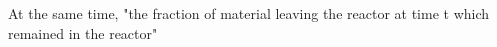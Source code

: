 At the same time, "the fraction of material leaving the reactor at time t which remained in the reactor"  